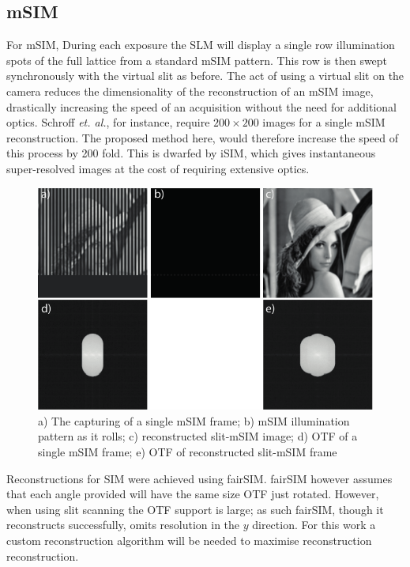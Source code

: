 \subsection{mSIM}

For mSIM, During each exposure the SLM will display a single row illumination spots of the full lattice from a standard mSIM pattern.
This row is then swept synchronously with the virtual slit as before.
The act of using a virtual slit on the camera reduces the dimensionality of the reconstruction of an mSIM image, drastically increasing the speed of an acquisition without the need for additional optics.
Schroff \emph{et. al.}, for instance, require $200 \times 200$ images for a single mSIM reconstruction.
The proposed method here, would therefore increase the speed of this process by 200 fold.
This is dwarfed by iSIM, which gives instantaneous super-resolved images at the cost of requiring extensive optics.

\begin{figure}
  \centering
  \includegraphics{msim_slit}
  \caption{
  a) The capturing of a single mSIM frame;
  b) mSIM illumination pattern as it rolls;
  c) reconstructed slit-mSIM image;
  d) OTF of a single mSIM frame;
  e) OTF of reconstructed slit-mSIM frame
  }
  \label{}
\end{figure}

Reconstructions for SIM were achieved using fairSIM.
fairSIM however assumes that each angle provided will have the same size OTF just rotated.
However, when using slit scanning the OTF support is large; as such fairSIM, though it reconstructs successfully, omits resolution in the $y$ direction.
For this work a custom reconstruction algorithm will be needed to maximise reconstruction reconstruction.

